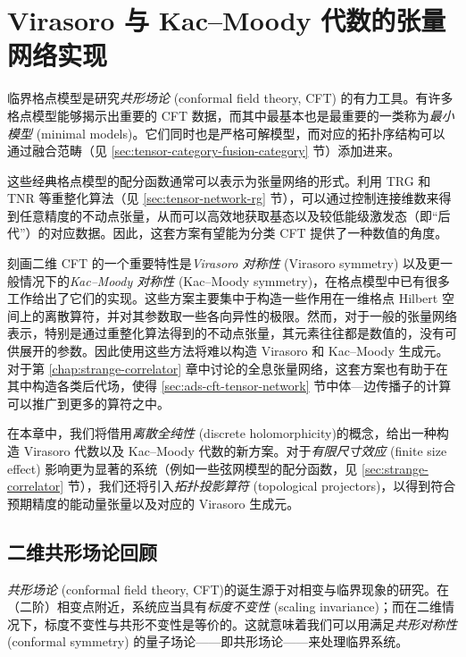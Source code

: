 \chapter{Virasoro 与 Kac--Moody 代数的张量网络实现}
\label{chap:virasoro}

临界格点模型是研究\emph{共形场论} (conformal field theory, CFT) 的有力工具。有许多格点模型能够揭示出重要的 CFT 数据，而其中最基本也是最重要的一类称为\emph{最小模型} (minimal models)。它们同时也是严格可解模型，而对应的拓扑序结构可以通过融合范畴（见 \ref{sec:tensor-category-fusion-category} 节）添加进来\cite{aasen2016topological,vanhove2018mapping,aasen2020topological,huang2022numerical,vanhove2022critical}。

这些经典格点模型的配分函数通常可以表示为张量网络的形式。利用 TRG 和 TNR 等重整化算法（见 \ref{sec:tensor-network-rg} 节），可以通过控制连接维数来得到任意精度的不动点张量，从而可以高效地获取基态以及较低能级激发态（即“后代”）的对应数据。因此，这套方案有望能为分类 CFT 提供了一种数值的角度。

刻画二维 CFT 的一个重要特性是\emph{Virasoro 对称性} (Virasoro symmetry) 以及更一般情况下的\emph{Kac--Moody 对称性} (Kac--Moody symmetry)，在格点模型中已有很多工作给出了它们的实现\cite{pasquier1990common,koo1994representations,milsted2017extraction,zou2018conformal,hongler2022conformal,wang2022emergence}。这些方案主要集中于构造一些作用在一维格点 Hilbert 空间上的离散算符，并对其参数取一些各向异性的极限。然而，对于一般的张量网络表示，特别是通过重整化算法得到的不动点张量，其元素往往都是数值的，没有可供展开的参数。因此使用这些方法将难以构造 Virasoro 和 Kac--Moody 生成元。对于第 \ref{chap:strange-correlator} 章中讨论的全息张量网络，这套方案也有助于在其中构造各类后代场，使得 \ref{sec:ads-cft-tensor-network} 节中体—边传播子的计算可以推广到更多的算符之中。

在本章中，我们将借用\emph{离散全纯性} (discrete holomorphicity)\cite{cardy2009discrete}的概念，给出一种构造 Virasoro 代数以及 Kac--Moody 代数的新方案\cite{wang2022virasoro,zeng2023virasoro}。对于\emph{有限尺寸效应} (finite size effect) 影响更为显著的系统（例如一些弦网模型的配分函数，见 \ref{sec:strange-correlator} 节），我们还将引入\emph{拓扑投影算符} (topological projectors)，以得到符合预期精度的能动量张量以及对应的 Virasoro 生成元。

\section{二维共形场论回顾}
\label{sec:cft-review}

\emph{共形场论} (conformal field theory, CFT)\cite{belavin1984infinite,ginsparg1988applied,francesco2012conformal}的诞生源于对相变与临界现象的研究。在（二阶）相变点附近，系统应当具有\emph{标度不变性} (scaling invariance)；而在二维情况下，标度不变性与共形不变性是等价的。这就意味着我们可以用满足\emph{共形对称性} (conformal symmetry) 的量子场论——即共形场论——来处理临界系统。

